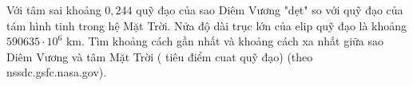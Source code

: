 \begin{bt}%
	Với tâm sai khoảng $0{,}244$ quỹ đạo của sao Diêm Vương "dẹt" so với quỹ đạo của tám hình tinh trong hệ Mặt Trời. Nửa độ dài trục lớn của elip quỹ đạo là khoảng $590635\cdot 10^6$ km. Tìm khoảng cách gần nhất và khoảng cách xa nhất giữa sao Diêm Vương và tâm Mặt Trời ( tiêu điểm cuat quỹ đạo) (theo nssdc.gsfc.nasa.gov). 
\end{bt}


